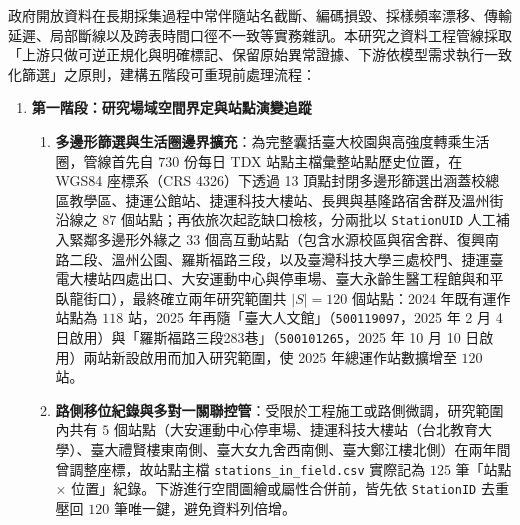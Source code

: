 政府開放資料在長期採集過程中常伴隨站名截斷、編碼損毀、採樣頻率漂移、傳輸延遲、局部斷線以及跨表時間口徑不一致等實務雜訊。本研究之資料工程管線採取「上游只做可逆正規化與明確標記、保留原始異常證據、下游依模型需求執行一致化篩選」之原則，建構五階段可重現前處理流程：

\begin{enumerate}
    \item \textbf{第一階段：研究場域空間界定與站點演變追蹤}
    \begin{enumerate}[label = \textbullet]
        \item \textbf{多邊形篩選與生活圈邊界擴充}：為完整囊括臺大校園與高強度轉乘生活圈，管線首先自 $730$ 份每日 TDX 站點主檔彙整站點歷史位置，在 WGS84 座標系（CRS 4326）下透過 13 頂點封閉多邊形篩選出涵蓋校總區教學區、捷運公館站、捷運科技大樓站、長興與基隆路宿舍群及溫州街沿線之 $87$ 個站點；再依旅次起訖缺口檢核，分兩批以 \texttt{StationUID} 人工補入緊鄰多邊形外緣之 $33$ 個高互動站點（包含水源校區與宿舍群、復興南路二段、溫州公園、羅斯福路三段，以及臺灣科技大學三處校門、捷運臺電大樓站四處出口、大安運動中心與停車場、臺大永齡生醫工程館與和平臥龍街口），最終確立兩年研究範圍共 $|S| = 120$ 個站點：2024 年既有運作站點為 $118$ 站，2025 年再隨「臺大人文館」（\texttt{500119097}，2025 年 2 月 4 日啟用）與「羅斯福路三段283巷」（\texttt{500101265}，2025 年 10 月 10 日啟用）兩站新設啟用而加入研究範圍，使 2025 年總運作站數擴增至 $120$ 站。
        \item \textbf{路側移位紀錄與多對一關聯控管}：受限於工程施工或路側微調，研究範圍內共有 $5$ 個站點（大安運動中心停車場、捷運科技大樓站（台北教育大學）、臺大禮賢樓東南側、臺大女九舍西南側、臺大鄭江樓北側）在兩年間曾調整座標，故站點主檔 \texttt{stations\_in\_field.csv} 實際記為 $125$ 筆「站點 $\times$ 位置」紀錄。下游進行空間圖繪或屬性合併前，皆先依 \texttt{StationID} 去重壓回 $120$ 筆唯一鍵，避免資料列倍增。
    \end{enumerate}


\end{enumerate}
